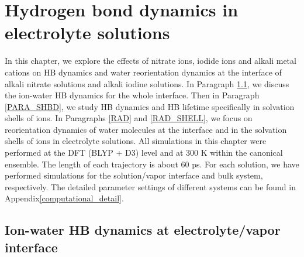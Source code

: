 \chapter{Hydrogen bond dynamics in electrolyte solutions}\label{CHAPTER_HBD_Solutions}
In this chapter, we explore the effects of nitrate ions, iodide ions and alkali metal cations 
on HB dynamics and water reorientation dynamics at the interface of alkali nitrate solutions and alkali
iodine solutions. 
In Paragraph \ref{HBD_ITP}, we discuss the ion-water HB dynamics for the whole interface. 
Then in Paragraph \ref{PARA_SHBD}, we study HB dynamics and HB lifetime specifically in solvation shells of ions.
In Paragraphs \ref{RAD} and \ref{RAD_SHELL}, we focus on reorientation dynamics of water molecules at the interface
and in the solvation shells of ions in electrolyte solutions.
All simulations in this chapter were performed at the DFT (BLYP + D3) level and at 300 K within the canonical ensemble.
The length of each trajectory is about 60 ps.
For each solution, we have performed simulations for the solution/vapor interface and bulk system, respectively. 
The detailed parameter settings of different systems can be found in Appendix\thinspace\ref{computational_detail}.

\section{Ion-water HB dynamics at electrolyte/vapor interface}\label{HBD_ITP}
